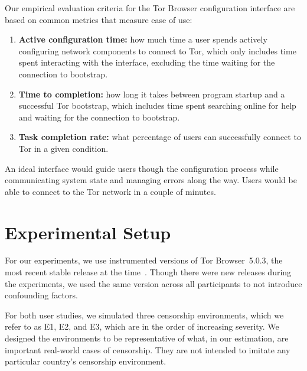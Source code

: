 \documentclass[USenglish,oneside,twocolumn]{article}
\begin{document}
Our empirical evaluation criteria for the Tor Browser configuration
interface are based on common metrics that measure ease of use: \\

\begin{enumerate}
    \item {\bfseries Active configuration time:} how much time a user spends actively configuring network components to connect to Tor, which only includes time spent interacting with the interface, excluding the time waiting for the connection to bootstrap.
    \item {\bfseries  Time to completion:} how long it takes between program startup and a successful Tor bootstrap, which includes time spent searching online for help and waiting for the connection to bootstrap.
    \item {\bfseries Task completion rate:} what percentage of users can successfully connect to Tor in a given condition.
\end{enumerate}

An ideal interface would guide users though the configuration process while communicating system state and managing errors along the way. Users would be able to connect to the Tor network in a couple of minutes. 

\section{Experimental Setup}
\label{sec:environments}
For our experiments, we use instrumented versions of Tor Browser~5.0.3, 
the most recent stable release at the time~\cite{torbrowser-503}.
Though there were new releases during the experiments,
we used the same version across all participants to not introduce
confounding factors.

For both user studies, we simulated three censorship environments,
which we refer to as E1, E2, and E3, which are in  the order of increasing severity.
We designed the environments to be representative
of what, in our estimation, are important real-world
cases of censorship. They are not intended to imitate
any particular country's censorship environment.

\smallskip
\end{document}
